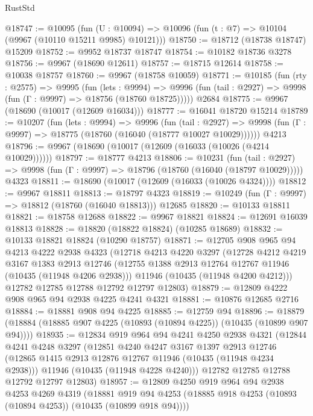 \begin{lexlean}{RustStd}
\begin{coremodule}
@18747 := @10095
    (fun (U : @10094) => @10096 (fun (t : @7) => @10104 (@9967 (@10110 @15211 @9985) @10121)))
@18750 := @18712 (@18738 @18747) @15209
@18752 := @9952 @18737 @18747
@18754 := @10182 @18736 @3278
@18756 := @9967 (@18690 @12611)
@18757 := @18715 @12614
@18758 := @10038 @18757
@18760 := @9967 (@18758 @10059)
@18771 := @10185
    (fun (rty : @2575) =>
    @9995
      (fun (lets : @9994) =>
      @9996 (fun (tail : @2927) => @9998 (fun (Γ : @9997) => @18756 (@18760 @18725)))))
    @2684
@18775 := @9967 (@18690 (@10017 (@12609 @16034)))
@18777 := @16041 @18720 @15214
@18789 := @10207
    (fun (lets : @9994) =>
    @9996
      (fun (tail : @2927) =>
      @9998 (fun (Γ : @9997) => @18775 (@18760 (@16040 (@18777 @10027 @10029))))))
    @4213
@18796 := @9967 (@18690 (@10017 (@12609 (@16033 (@10026 (@4214 @10029))))))
@18797 := @18777 @4213
@18806 := @10231
    (fun (tail : @2927) => @9998 (fun (Γ : @9997) => @18796 (@18760 (@16040 (@18797 @10029)))))
    @4323
@18811 := @18690 (@10017 (@12609 (@16033 (@10026 @4324))))
@18812 := @9967 @18811
@18813 := @18797 @4323
@18819 := @10249 (fun (Γ : @9997) => @18812 (@18760 (@16040 @18813))) @12685
@18820 := @10133 @18811
@18821 := @18758 @12688
@18822 := @9967 @18821
@18824 := @12691 @16039 @18813
@18828 := @18820 (@18822 @18824) (@10285 @18689)
@18832 := @10133 @18821 @18824 (@10290 @18757)
@18871 := @12705
    @908
    @965
    @94
    @4213
    @4222
    @2938
    @4323
    (@12718
      @4213
      @4220
      @3297
      (@12728
        @4212
        @4219
        @3167
        @1383
        @2913
        @12746
        (@12755 @1388 @2913 @12764 @12767 @11946 (@10435 (@11948 @4206 @2938)))
        @11946
        (@10435 (@11948 @4200 @4212)))
      @12782
      @12785
      @12788
      @12792
      @12797
      @12803)
@18879 := @12809 @4222 @908 @965 @94 @2938 @4225 @4241 @4321
@18881 := @10876 @12685 @2716
@18884 := @18881 @908 @94 @4225
@18885 := @12759 @94
@18896 := @18879 (@18884 (@18885 @907 @4225 (@10893 (@10894 @4225)) (@10435 (@10899 @907 @94))))
@18935 := @12834
    @919
    @964
    @94
    @4241
    @4250
    @2938
    @4321
    (@12844
      @4241
      @4248
      @3297
      (@12851
        @4240
        @4247
        @3167
        @1397
        @2913
        @12746
        (@12865 @1415 @2913 @12876 @12767 @11946 (@10435 (@11948 @4234 @2938)))
        @11946
        (@10435 (@11948 @4228 @4240)))
      @12782
      @12785
      @12788
      @12792
      @12797
      @12803)
@18957 := @12809
    @4250
    @919
    @964
    @94
    @2938
    @4253
    @4269
    @4319
    (@18881 @919 @94 @4253 (@18885 @918 @4253 (@10893 (@10894 @4253)) (@10435 (@10899 @918 @94))))

\end{coremodule}
\end{lexlean}
